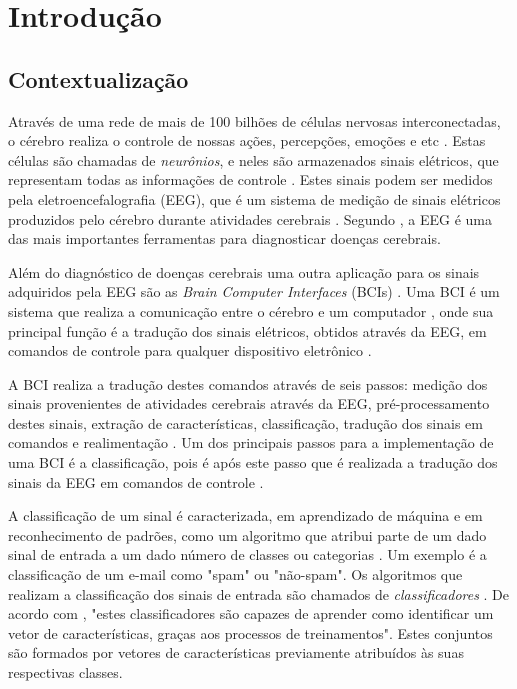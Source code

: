 \chapter[Introdução]{Introdução}

\section{Contextualização}

Através de uma rede de mais de 100 bilhões de células nervosas interconectadas, o cérebro realiza o controle de nossas ações, percepções, emoções e etc \cite{KANDEL}. Estas células são chamadas de \textit{neurônios}, e neles são armazenados sinais elétricos, que representam todas as informações de controle \cite{Siulybook}. Estes sinais podem ser medidos pela eletroencefalografia (EEG), que é um sistema de medição de sinais elétricos produzidos pelo cérebro durante atividades cerebrais \cite{F.Lotte}. Segundo \cite{SIULYDissertacao}, a EEG é uma das mais importantes ferramentas para diagnosticar doenças cerebrais.

Além do diagnóstico de doenças cerebrais uma outra aplicação para os sinais adquiridos pela EEG são as \textit{Brain Computer Interfaces} (BCIs) \cite{F.Lotte}. Uma BCI é um sistema que realiza a comunicação entre o cérebro e um computador \cite{Siulybook}, onde sua principal função é a tradução dos sinais elétricos, obtidos através da EEG, em comandos de controle para qualquer dispositivo eletrônico \cite{Siulybook}.

A BCI realiza a tradução destes comandos através de seis passos: medição dos sinais provenientes de atividades cerebrais através da EEG, pré-processamento destes sinais, extração de características, classificação, tradução dos sinais em comandos e realimentação \cite{MasonAndBirch}. Um dos principais passos para a implementação de uma BCI é a classificação, pois é após este passo que é realizada a tradução dos sinais da EEG em comandos de controle \cite{MasonAndBirch}.

A classificação de um sinal é caracterizada, em aprendizado de máquina e em reconhecimento de padrões, como um algoritmo que atribui parte de um dado sinal de entrada a um dado número de classes ou categorias \cite{brunelli2009template}. Um exemplo é a classificação de um e-mail como "spam" ou "não-spam". Os algoritmos que realizam a classificação dos sinais de entrada são chamados de \textit{classificadores} \cite{Siulybook}. De acordo com \cite{lottephd}, "estes classificadores são capazes de aprender como identificar um vetor de características, graças aos processos de treinamentos". Estes conjuntos são formados por vetores de características previamente atribuídos às suas respectivas classes.


